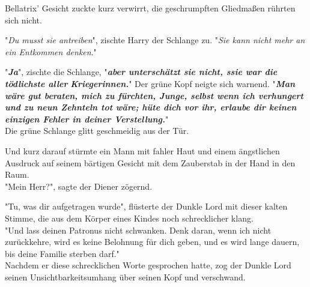{Bellatrix' Gesicht zuckte kurz verwirrt, die geschrumpften Gliedmaßen rührten sich nicht.

"\emph{Du musst sie antreiben}", zischte Harry der Schlange zu. "\emph{Sie kann nicht mehr an ein Entkommen denken}."

"\textbf{\emph{Ja}}", zischte die Schlange, "\textbf{\emph{aber unterschätzt sie nicht, ssie war die tödlichste aller}} \textbf{\emph{Kriegerinnen.}}" Der grüne Kopf neigte sich warnend. "\textbf{\emph{Man wäre gut beraten, mich zu fürchten, Junge, selbst wenn ich verhungert und zu neun Zehnteln tot wäre; hüte dich vor ihr, erlaube dir keinen einzigen Fehler in deiner Verstellung.}}"\\ Die grüne Schlange glitt geschmeidig aus der Tür.

Und kurz darauf stürmte ein Mann mit fahler Haut und einem ängstlichen Ausdruck auf seinem bärtigen Gesicht mit dem Zauberstab in der Hand in den Raum.\\ "Mein Herr?", sagte der Diener zögernd.

"Tu, was dir aufgetragen wurde", flüsterte der Dunkle Lord mit dieser kalten Stimme, die aus dem Körper eines Kindes noch schrecklicher klang.\\ "Und lass deinen Patronus nicht schwanken. Denk daran, wenn ich nicht zurückkehre, wird es keine Belohnung für dich geben, und es wird lange dauern, bis deine Familie sterben darf."\\ Nachdem er diese schrecklichen Worte gesprochen hatte, zog der Dunkle Lord seinen Unsichtbarkeitsumhang über seinen Kopf und verschwand.

}
